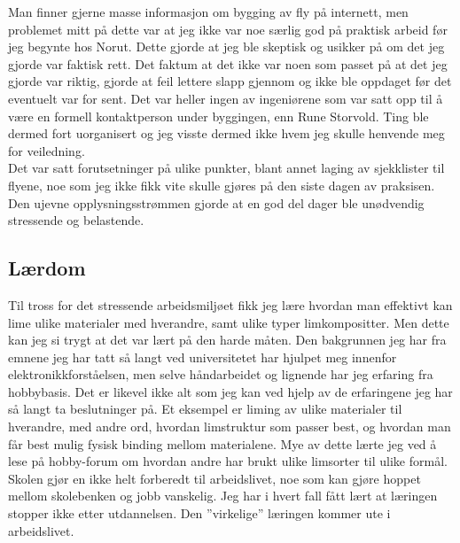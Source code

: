 \documentclass[12pt, a4paper]{report}
\begin{document}
Man finner gjerne masse informasjon om bygging av fly på internett, men problemet mitt på dette var at jeg ikke var noe særlig god på praktisk arbeid før jeg begynte hos Norut. Dette gjorde at jeg ble skeptisk og usikker på om det jeg gjorde var faktisk rett. Det faktum at det ikke var noen som passet på at det jeg gjorde var riktig, gjorde at feil lettere slapp gjennom og ikke ble oppdaget før det eventuelt var for sent. Det var heller ingen av ingeniørene som var satt opp til å være en formell kontaktperson under byggingen, enn Rune Storvold. Ting ble dermed fort uorganisert og jeg visste dermed ikke hvem jeg skulle henvende meg for veiledning. \\

Det var satt forutsetninger på ulike punkter, blant annet laging av sjekklister til flyene, noe som jeg ikke fikk vite skulle gjøres på den siste dagen av praksisen. Den ujevne opplysningsstrømmen gjorde at en god del dager ble unødvendig stressende og belastende. 

\subsection{Lærdom}
Til tross for det stressende arbeidsmiljøet fikk jeg lære hvordan man effektivt kan lime ulike materialer med hverandre, samt ulike typer limkompositter. Men dette kan jeg si trygt at det var lært på den harde måten. Den bakgrunnen jeg har fra emnene jeg har tatt så langt ved universitetet har hjulpet meg innenfor elektronikkforståelsen, men selve håndarbeidet og lignende har jeg erfaring fra hobbybasis. Det er likevel ikke alt som jeg kan ved hjelp av de erfaringene jeg har så langt ta beslutninger på. Et eksempel er liming av ulike materialer til hverandre, med andre ord, hvordan limstruktur som passer best, og hvordan man får best mulig fysisk binding mellom materialene. Mye av dette lærte jeg ved å lese på hobby-forum om hvordan andre har brukt ulike limsorter til ulike formål. \\
Skolen gjør en ikke helt forberedt til arbeidslivet, noe som kan gjøre hoppet mellom skolebenken og jobb vanskelig. Jeg har i hvert fall fått lært at læringen stopper ikke etter utdannelsen. Den ''virkelige'' læringen kommer ute i arbeidslivet. 
\end{document}
